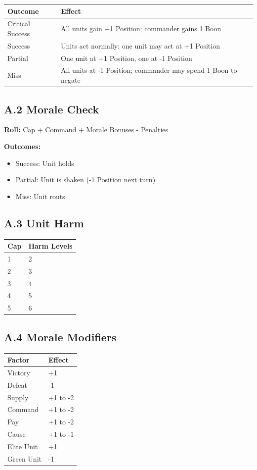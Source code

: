 \documentclass[11pt]{article}
\begin{document}
\begin{tabular}{|l|l|}
\hline
Outcome & Effect \\
\hline
Critical Success & All units gain +1 Position; commander gains 1 Boon \\
\hline
Success & Units act normally; one unit may act at +1 Position \\
\hline
Partial & One unit at +1 Position, one at -1 Position \\
\hline
Miss & All units at -1 Position; commander may spend 1 Boon to negate \\
\hline
\end{tabular}

\subsection{A.2 Morale Check}

\textbf{Roll:} Cap + Command + Morale Bonuses - Penalties

\textbf{Outcomes:}
\begin{itemize}
  \item Success: Unit holds
  \item Partial: Unit is shaken (-1 Position next turn)
  \item Miss: Unit routs
\end{itemize}

\subsection{A.3 Unit Harm}

\begin{tabular}{|l|l|}
\hline
Cap & Harm Levels \\
\hline
1 & 2 \\
\hline
2 & 3 \\
\hline
3 & 4 \\
\hline
4 & 5 \\
\hline
5 & 6 \\
\hline
\end{tabular}

\subsection{A.4 Morale Modifiers}

\begin{tabular}{|l|l|}
\hline
Factor & Effect \\
\hline
Victory & +1 \\
\hline
Defeat & -1 \\
\hline
Supply & +1 to -2 \\
\hline
Command & +1 to -2 \\
\hline
Pay & +1 to -2 \\
\hline
Cause & +1 to -1 \\
\hline
Elite Unit & +1 \\
\hline
Green Unit & -1 \\
\hline
\end{tabular}
\end{document}
